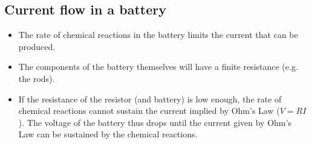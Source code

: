 \documentclass[aspectratio=169,
hyperref={colorlinks,urlcolor=blue}
]{beamer}
\begin{document}
\subsection{Current flow in a battery}
\label{subsec:currentflowinabattery}
{
\begin{itemize}
\item The rate of chemical reactions in the battery limits the current that can be produced. 
\item The components of the battery themselves will have a finite resistance (e.g. the rods). 
\item If the resistance of the resistor (and battery) is low enough, the rate of chemical reactions cannot sustain the current implied by Ohm's Law ($V=RI$). The voltage of the battery thus drops until the current given by Ohm's Law can be sustained by the chemical reactions.
\end{itemize}
}
\end{document}
